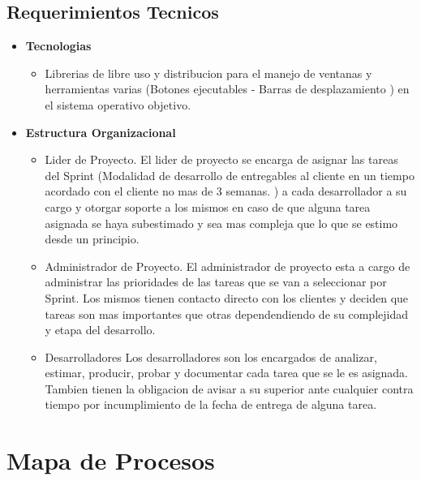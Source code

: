 \documentclass[
10pt, %
a4paper, %
oneside, %
headinclude,footinclude, %
BCOR5mm, %
]{scrartcl}
\begin{document}
\subsection{Requerimientos Tecnicos}
\begin{itemize}
  \item \textbf {Tecnologias}
  \begin{itemize}
    \item Librerias de libre uso y distribucion para el manejo de ventanas
          y herramientas varias (Botones ejecutables - Barras de desplazamiento )
          en el sistema operativo objetivo.
  \end{itemize}

  \item \textbf {Estructura Organizacional}
  \begin{itemize}
    \item Lider de Proyecto.
            El lider de proyecto se encarga de asignar las tareas del
            Sprint (Modalidad de desarrollo de entregables al cliente en un
                     tiempo acordado con el cliente no mas de 3 semanas. )
            a cada desarrollador a su cargo y otorgar soporte a los mismos
            en caso de que alguna tarea asignada se haya subestimado y sea
            mas compleja que lo que se estimo desde un principio.
    \item Administrador de Proyecto.
            El administrador de proyecto esta a cargo de administrar las
            prioridades de las tareas que se van a seleccionar por Sprint.
            Los mismos tienen contacto directo con los clientes y deciden
            que tareas son mas importantes que otras dependendiendo de su
            complejidad y etapa del desarrollo.
    \item Desarrolladores
            Los desarrolladores son los encargados de analizar, estimar,
            producir, probar y documentar cada tarea que se le es asignada.
            Tambien tienen la obligacion de avisar a su superior ante cualquier
            contra tiempo por incumplimiento de la fecha de entrega de alguna tarea.
  \end{itemize}
\end{itemize}


\section{Mapa de Procesos}
  
\end{document}
